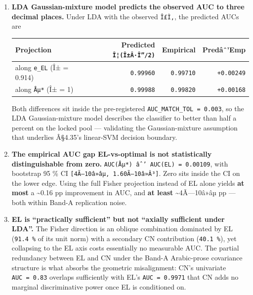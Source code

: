 \documentclass[
]{article}
\newcounter{none} %
\begin{document}
\begin{enumerate}
\def\labelenumi{\arabic{enumi}.}
\item
  \textbf{LDA Gaussian-mixture model predicts the observed AUC to three
  decimal places.} Under LDA with the observed \texttt{Î£Ì‚}, the
  predicted AUCs are

  {\def\LTcaptype{none} %
  \begin{longtable}[]{@{}lrrr@{}}
  \toprule\noalign{}
  Projection & Predicted \texttt{Î¦(Î±Â·Î”/2)} & Empirical &
  Predâˆ'Emp \\
  \midrule\noalign{}
  \endhead
  \bottomrule\noalign{}
  \endlastfoot
  along \texttt{e\_EL} (Î± = 0.914) & \texttt{0.99960} &
  \texttt{0.99710} & \texttt{+0.00249} \\
  along \texttt{Åµ*} (Î± = 1) & \texttt{0.99988} & \texttt{0.99820} &
  \texttt{+0.00168} \\
  \end{longtable}
  }

  Both differences sit inside the pre-registered
  \texttt{AUC\_MATCH\_TOL\ =\ 0.003}, so the LDA Gaussian-mixture model
  describes the classifier to better than half a percent on the locked
  pool --- validating the Gaussian-mixture assumption that underlies
  Â§4.35's linear-SVM decision boundary.
\item
  \textbf{The empirical AUC gap EL-vs-optimal is not statistically
  distinguishable from zero.}
  \texttt{AUC(Åµ*)\ âˆ’\ AUC(EL)\ =\ 0.00109}, with bootstrap 95 \% CI
  \texttt{{[}4Ã—10â»âµ,\ 1.60Ã—10â»Â³{]}}. Zero sits inside the CI on
  the lower edge. Using the full Fisher projection instead of EL alone
  yields \textbf{at most} a \textasciitilde0.16 pp improvement in AUC,
  and \textbf{at least} \textasciitilde4Ã---10â»âµ pp --- both within
  Band-A replication noise.
\item
  \textbf{EL is ``practically sufficient'' but not ``axially sufficient
  under LDA''.} The Fisher direction is an oblique combination dominated
  by EL (\texttt{91.4\ \%} of its unit norm) with a secondary CN
  contribution (\texttt{40.1\ \%}), yet collapsing to the EL axis costs
  essentially no measurable AUC. The partial redundancy between EL and
  CN under the Band-A Arabic-prose covariance structure is what absorbs
  the geometric misalignment: CN's univariate \texttt{AUC\ =\ 0.83}
  overlaps sufficiently with EL's \texttt{AUC\ =\ 0.9971} that CN adds
  no marginal discriminative power once EL is conditioned on.
\end{enumerate}
\end{document}
